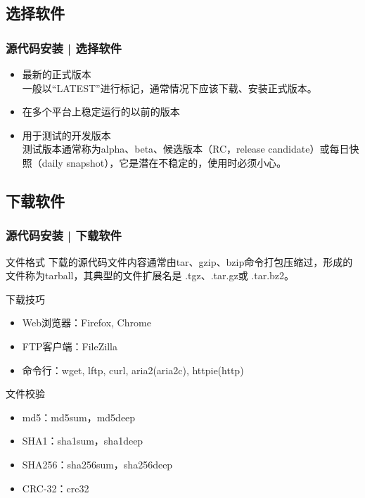 \subsection{选择软件}
\begin{frame}
  \frametitle{源代码安装 | 选择软件}
  \begin{itemize}
    \item 最新的正式版本\\
      一般以“LATEST”进行标记，通常情况下应该下载、安装正式版本。
    \item 在多个平台上稳定运行的以前的版本
    \item 用于测试的开发版本\\
      测试版本通常称为alpha、beta、候选版本（RC，release candidate）或每日快照（daily snapshot），它是潜在不稳定的，使用时必须小心。
  \end{itemize}
\end{frame}

\subsection{下载软件}
\begin{frame}
  \frametitle{源代码安装 | 下载软件}
  \begin{block}{文件格式}
    下载的源代码文件内容通常由tar、gzip、bzip命令打包压缩过，形成的文件称为tarball，其典型的文件扩展名是 .tgz、.tar.gz或 .tar.bz2。
  \end{block}
  \pause
  \begin{block}{下载技巧}
    \begin{itemize}
      \item Web浏览器：Firefox, Chrome
      \item FTP客户端：FileZilla
      \item 命令行：wget, lftp, curl, aria2(aria2c), httpie(http)
    \end{itemize}
  \end{block}
  \pause
  \begin{block}{文件校验}
    \begin{itemize}
      \item md5：md5sum，md5deep
      \item SHA1：sha1sum，sha1deep
      \item SHA256：sha256sum，sha256deep
      \item CRC-32：crc32
    \end{itemize}
  \end{block}
\end{frame}

